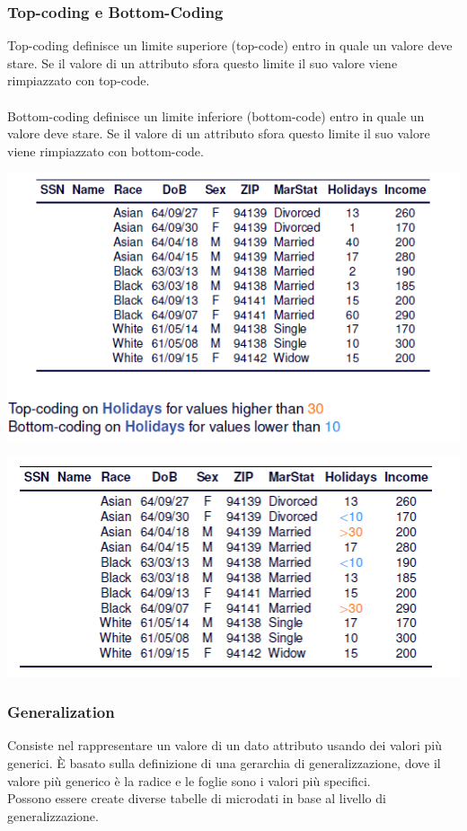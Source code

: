 \subsubsection{Top-coding e Bottom-Coding}
Top-coding definisce un limite superiore (top-code) entro in quale un valore deve stare. Se il valore di un attributo sfora questo limite il suo valore viene rimpiazzato con top-code.\\\\
Bottom-coding definisce un limite inferiore (bottom-code) entro in quale un valore deve stare. Se il valore di un attributo sfora questo limite il suo valore viene rimpiazzato con bottom-code.
\begin{center}
    \includegraphics[scale=0.5]{img/topbott1.png}
\end{center}
\begin{center}
    \includegraphics[scale=0.5]{img/topbott2.png}
\end{center}

\subsubsection{Generalization}
Consiste nel rappresentare un valore di un dato attributo usando dei valori più generici. È basato sulla definizione di una gerarchia di generalizzazione, dove il valore più generico è la radice e le foglie sono i valori più specifici.\\
Possono essere create diverse tabelle di microdati in base al livello di generalizzazione.

